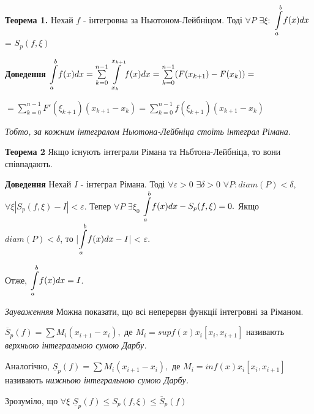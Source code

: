 \documentclass[12pt]{report}
\begin{document}
\textbf{Теорема 1.} Нехай  $ f $ - інтегровна за Ньютоном-Лейбніцом. Тоді $ \forall P  $
$ \exists \xi : $ $\mathlarger\int\limits_ a^b f(x)dx$ = $ S_p (f, \xi) $

\textbf{Доведення} $\mathlarger\int\limits_ a^b f(x)dx =  \sum\limits_{k=0}^{n-1}\mathlarger\int\limits_{x_k}^{x_{k+1}} f(x)dx = \sum\limits_{k=0}^{n-1}(F(x_{k+1}) - F(x_k)) =$

$=  \sum\limits_{k=0}^{n-1} F'(\xi_{k+1}) (x_{k+1} - x_k) = \sum\limits_{k=0}^{n-1} f(\xi_{k+1})(x_{k+1} - x_k)$

\vspace{5 mm} 
\textit{Тобто, за кожним інтегралом Ньютона-Лейбніца стоїть інтеграл Рімана.}

\vspace{5 mm} 

\textbf{Теорема 2} Якщо існують інтеграли Рімана та Ньбтона-Лейбніца, то вони співпадають.

\textbf{Доведення} Нехай $ I $ - інтеграл Рімана. Тоді $ \forall \varepsilon > 0 $  $\exists \delta > 0  $ $ \forall P: diam (P)  < \delta , $  $ \forall \xi |S_p(f, \xi) - I| < \varepsilon.$ Тепер 
$ \forall P$ $ \exists \xi_0  $ $ \mathlarger\int\limits_a^b f(x) dx - S_p (f, \xi) = 0.$
 Якщо $ diam(P)< \delta $, то |$\mathlarger\int\limits_a^b f(x) dx  - I  $| < $ \varepsilon. $
 
Отже, $\mathlarger\int\limits_a^b f(x) dx   = I$.

\vspace{5 mm} 
\textit{Зауваженняя} Можна показати, що всі неперервн функції інтегровні за Ріманом.

\vspace{5 mm} 

$ \overline S_p(f) = \sum M_i (x_{i+1} - x_{i}) ,$ де $ M_i = supf(x)  x_i [x_i, x_{i+1}]$
називають \textit{верхньою інтегральною сумою Дарбу.}

Аналогічно, $ \underline S_p(f) = \sum M_i (x_{i+1} - x_{i}) ,$ де $ M_i = inf(x)  x_i [x_i, x_{i+1}]$ називають \textit{нижньою інтегральною сумою Дарбу.}

\vspace{3 mm} 
Зрозуміло, що $ \forall \xi  $ $ \underline S_p(f) \leq S_p (f, \xi) \leq  \overline S_p(f)$
\end{document}
